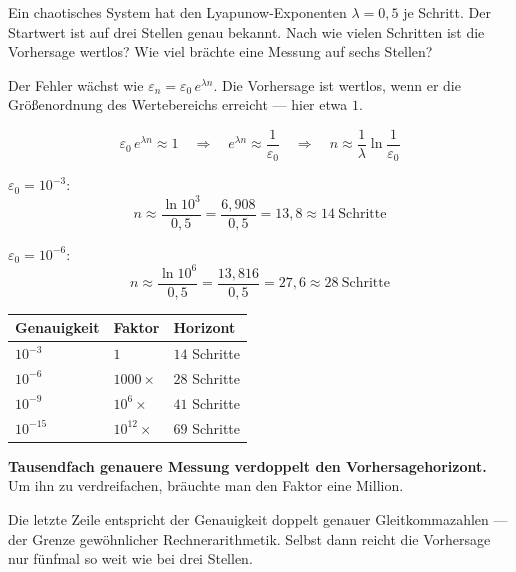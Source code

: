 \begin{aufgabe}
Ein chaotisches System hat den Lyapunow-Exponenten $\lambda = 0{,}5$ je Schritt. Der Startwert ist auf drei Stellen genau bekannt. Nach wie vielen Schritten ist die Vorhersage wertlos? Wie viel brächte eine Messung auf sechs Stellen?

\loesung
{}
Der Fehler wächst wie $\varepsilon_n = \varepsilon_0\,e^{\lambda n}$. Die Vorhersage ist wertlos, wenn er die Größenordnung des Wertebereichs erreicht --- hier etwa $1$.

\[ \varepsilon_0\,e^{\lambda n} \approx 1 \quad\Longrightarrow\quad e^{\lambda n} \approx \frac{1}{\varepsilon_0} \quad\Longrightarrow\quad n \approx \frac{1}{\lambda}\ln\frac{1}{\varepsilon_0} \]

$\varepsilon_0 = 10^{-3}$:
\[ n \approx \frac{\ln 10^3}{0{,}5} = \frac{6{,}908}{0{,}5} = 13{,}8 \approx 14 \ \text{Schritte} \]

$\varepsilon_0 = 10^{-6}$:
\[ n \approx \frac{\ln 10^6}{0{,}5} = \frac{13{,}816}{0{,}5} = 27{,}6 \approx 28 \ \text{Schritte} \]

\begin{center}
\renewcommand{\arraystretch}{1.48}
\begin{tabular}{@{}P{2.4cm}P{2.4cm}P{2.8cm}@{}}
\toprule
\textbf{Genauigkeit} & \textbf{Faktor} & \textbf{Horizont}\\
\midrule
$10^{-3}$ & $1$ & $14$ Schritte\\
$10^{-6}$ & $1000\times$ & $28$ Schritte\\
$10^{-9}$ & $10^6\times$ & $41$ Schritte\\
$10^{-15}$ & $10^{12}\times$ & $69$ Schritte\\
\bottomrule
\end{tabular}
\end{center}

\begin{center}
\begin{minipage}{0.9\textwidth}
\textbf{Tausendfach genauere Messung verdoppelt den Vorhersagehorizont.} Um ihn zu verdreifachen, bräuchte man den Faktor eine Million.
\end{minipage}
\end{center}

Die letzte Zeile entspricht der Genauigkeit doppelt genauer Gleitkommazahlen --- der Grenze gewöhnlicher Rechnerarithmetik. Selbst dann reicht die Vorhersage nur fünfmal so weit wie bei drei Stellen.


\end{aufgabe}
